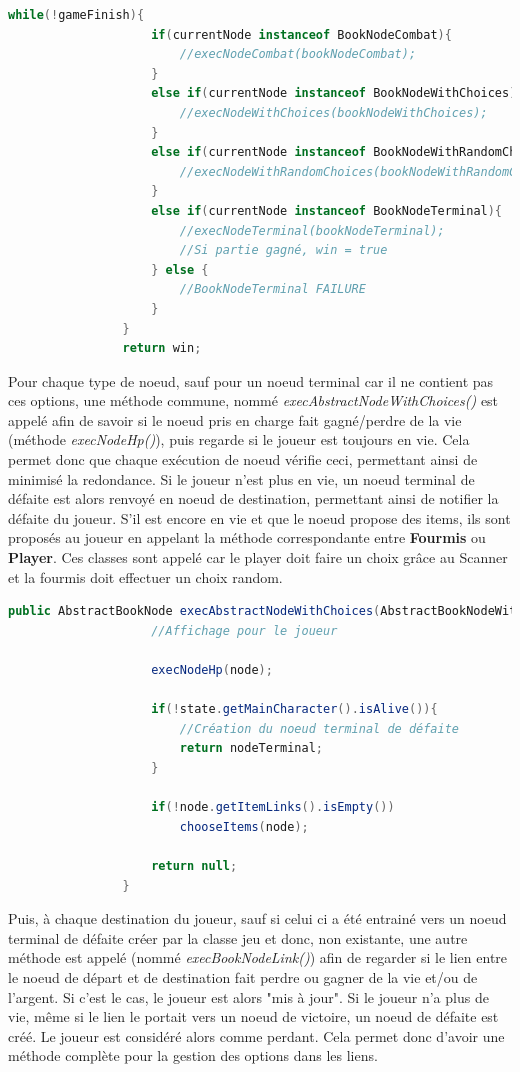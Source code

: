 			\begin{lstlisting}[gobble=16, language=java, label=lst:runGame, caption=Méthode runGame()]
				while(!gameFinish){
					if(currentNode instanceof BookNodeCombat){
						//execNodeCombat(bookNodeCombat);
					}
					else if(currentNode instanceof BookNodeWithChoices){
						//execNodeWithChoices(bookNodeWithChoices);
					}
					else if(currentNode instanceof BookNodeWithRandomChoices){
						//execNodeWithRandomChoices(bookNodeWithRandomChoices);
					}
					else if(currentNode instanceof BookNodeTerminal){
						//execNodeTerminal(bookNodeTerminal);
						//Si partie gagné, win = true
					} else {
						//BookNodeTerminal FAILURE
					}
				}
				return win;
			\end{lstlisting}

			Pour chaque type de noeud, sauf pour un noeud terminal car il ne contient pas ces options, une méthode commune, nommé \textit{execAbstractNodeWithChoices()} est appelé afin de savoir si le noeud pris en charge fait gagné/perdre de la vie (méthode \textit{execNodeHp()}), puis regarde si le joueur est toujours en vie. Cela permet donc que chaque exécution de noeud vérifie ceci, permettant ainsi de minimisé la redondance. Si le joueur n'est plus en vie, un noeud terminal de défaite est alors renvoyé en noeud de destination, permettant ainsi de notifier la défaite du joueur. S'il est encore en vie et que le noeud propose des items, ils sont proposés au joueur en appelant la méthode correspondante entre \textbf{Fourmis} ou \textbf{Player}. Ces classes sont appelé car le player doit faire un choix grâce au Scanner et la fourmis doit effectuer un choix random.\\

			\begin{lstlisting}[gobble=12, language=java, caption=Méthode execAbstractNodeWithChoices(), label=lst:execAbstractNodeWithChoices]
				public AbstractBookNode execAbstractNodeWithChoices(AbstractBookNodeWithChoices node){
					//Affichage pour le joueur

					execNodeHp(node);

					if(!state.getMainCharacter().isAlive()){
						//Création du noeud terminal de défaite
						return nodeTerminal;
					}

					if(!node.getItemLinks().isEmpty())
						chooseItems(node);

					return null;
				}
			\end{lstlisting}

			Puis, à chaque destination du joueur, sauf si celui ci a été entrainé vers un noeud terminal de défaite créer par la classe jeu et donc, non existante, une autre méthode est appelé (nommé \textit{execBookNodeLink()}) afin de regarder si le lien entre le noeud de départ et de destination fait perdre ou gagner de la vie et/ou de l'argent. Si c'est le cas, le joueur est alors "mis à jour". Si le joueur n'a plus de vie, même si le lien le portait vers un noeud de victoire, un noeud de défaite est créé. Le joueur est considéré alors comme perdant. Cela permet donc d'avoir une méthode complète pour la gestion des options dans les liens.

